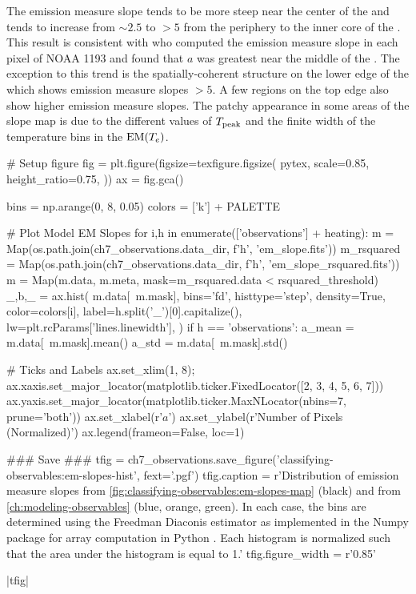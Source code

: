 The emission measure slope tends to be more steep near the center of the \AR{} and tends to increase from $\sim2.5$ to $>5$ from the periphery to the inner core of the \AR{}. This result is consistent with \citet{del_zanna_evolution_2015} who computed the emission measure slope in each pixel of \AR{} NOAA 1193 and found that $a$ was greatest near the middle of the \AR{}. The exception to this trend is the spatially-coherent structure on the lower edge of the \AR{} which shows emission measure slopes $>5$. A few regions on the top edge also show higher emission measure slopes. The patchy appearance in some areas of the slope map is due to the different values of $T_\textup{peak}$ and the finite width of the temperature bins in the $\textup{EM}(T_e)$.

\begin{pycode}
# Setup figure
fig = plt.figure(figsize=texfigure.figsize(
    pytex,
    scale=0.85,
    height_ratio=0.75,
))
ax = fig.gca()

bins = np.arange(0, 8, 0.05)
colors = ['k'] + PALETTE

# Plot Model EM Slopes
for i,h in enumerate(['observations'] + heating):
    m = Map(os.path.join(ch7_observations.data_dir, f'{h}', 'em_slope.fits'))
    m_rsquared = Map(os.path.join(ch7_observations.data_dir, f'{h}', 'em_slope_rsquared.fits'))
    m = Map(m.data, m.meta, mask=m_rsquared.data < rsquared_threshold)
    _,b,_ = ax.hist(
        m.data[~m.mask],
        bins='fd',
        histtype='step',
        density=True,
        color=colors[i],
        label=h.split('_')[0].capitalize(),
        lw=plt.rcParams['lines.linewidth'],
    )
    if h == 'observations':
        a_mean = m.data[~m.mask].mean()
        a_std = m.data[~m.mask].std()

# Ticks and Labels
ax.set_xlim(1, 8);
ax.xaxis.set_major_locator(matplotlib.ticker.FixedLocator([2, 3, 4, 5, 6, 7]))
ax.yaxis.set_major_locator(matplotlib.ticker.MaxNLocator(nbins=7, prune='both'))
ax.set_xlabel(r'$a$')
ax.set_ylabel(r'Number of Pixels (Normalized)')
ax.legend(frameon=False, loc=1)

### Save ###
tfig = ch7_observations.save_figure('classifying-observables:em-slopes-hist', fext='.pgf')
tfig.caption = r'Distribution of emission measure slopes from \autoref{fig:classifying-observables:em-slopes-map} (black) and from \autoref{ch:modeling-observables} (blue, orange, green). In each case, the bins are determined using the Freedman Diaconis estimator \citep{freedman_histogram_1981} as implemented in the Numpy package for array computation in Python \citep{oliphant_guide_2006}. Each histogram is normalized such that the area under the histogram is equal to 1.'
tfig.figure_width = r'0.85\columnwidth'
\end{pycode}
|tfig|

